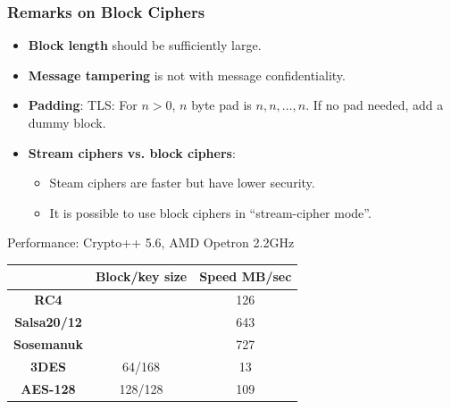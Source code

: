 \begin{frame}\frametitle{Remarks on Block Ciphers}
\begin{itemize}
\item \textbf{Block length} should be sufficiently large.
\item \textbf{Message tampering} is not with message confidentiality.
\item \textbf{Padding}: TLS: For $n>0$, $n$ byte pad is $n,n,\dots,n$.
If no pad needed, add a dummy block.
\item \textbf{Stream ciphers vs. block ciphers}: 
\begin{itemize}
\item Steam ciphers are faster but have lower security.
\item It is possible to use block ciphers in ``stream-cipher mode''. 
\end{itemize}
\end{itemize}
\begin{exampleblock}{Performance: Crypto++ 5.6, AMD Opetron 2.2GHz}
\begin{center}
\begin{tabular}{|c|c|c|} \hline
                      & \textbf{Block/key size} & \textbf{Speed MB/sec} \\ \hline
\textbf{RC4}          &         & 126 \\  
\textbf{Salsa20/12}   &         & 643 \\ 
\textbf{Sosemanuk}    &         & 727 \\ 
\textbf{3DES}	      & 64/168  & 13  \\
\textbf{AES-128}      & 128/128 & 109 \\ \hline 
\end{tabular}	
\end{center}
\end{exampleblock}
\end{frame}
